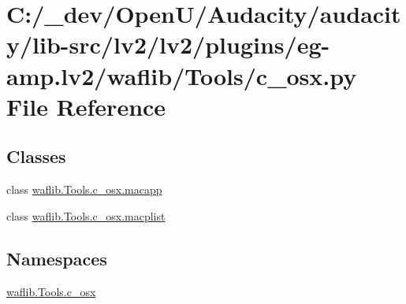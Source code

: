 \hypertarget{lv2_2plugins_2eg-amp_8lv2_2waflib_2_tools_2c__osx_8py}{}\section{C\+:/\+\_\+dev/\+Open\+U/\+Audacity/audacity/lib-\/src/lv2/lv2/plugins/eg-\/amp.lv2/waflib/\+Tools/c\+\_\+osx.py File Reference}
\label{lv2_2plugins_2eg-amp_8lv2_2waflib_2_tools_2c__osx_8py}
\subsection*{Classes}
\begin{DoxyCompactItemize}
\item 
class \hyperlink{classwaflib_1_1_tools_1_1c__osx_1_1macapp}{waflib.\+Tools.\+c\+\_\+osx.\+macapp}
\item 
class \hyperlink{classwaflib_1_1_tools_1_1c__osx_1_1macplist}{waflib.\+Tools.\+c\+\_\+osx.\+macplist}
\end{DoxyCompactItemize}
\subsection*{Namespaces}
\begin{DoxyCompactItemize}
\item 
 \hyperlink{namespacewaflib_1_1_tools_1_1c__osx}{waflib.\+Tools.\+c\+\_\+osx}
\end{DoxyCompactItemize}
